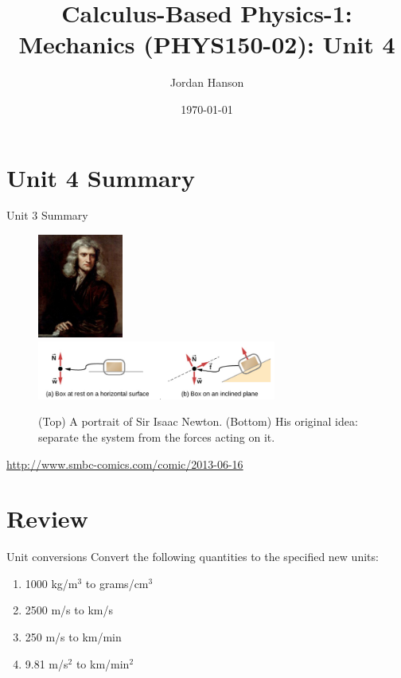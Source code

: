 \documentclass{beamer}
\title{Calculus-Based Physics-1: Mechanics (PHYS150-02): Unit 4}
\date{\today}
\author{Jordan Hanson}
\institute{Whittier College Department of Physics and Astronomy}
\begin{document}
\maketitle

\section{Unit 4 Summary}

\begin{frame}{Unit 3 Summary}
\begin{figure}
\centering
\includegraphics[width=0.25\textwidth]{figures/newton.png} \\
\includegraphics[width=0.7\textwidth]{figures/forcesA.png}
\caption{\label{fig:newton} (Top) A portrait of Sir Isaac Newton. (Bottom) His original idea: separate the system from the forces acting on it.}
\end{figure}
\url{http://www.smbc-comics.com/comic/2013-06-16}
\end{frame}

\section{Review}

\begin{frame}{Unit conversions}
Convert the following quantities to the specified new units:
\begin{enumerate}
\item 1000 kg/m$^3$ to grams/cm$^3$
\item 2500 m/s to km/s
\item 250 m/s to km/min
\item 9.81 m/s$^2$ to km/min$^2$
\end{enumerate}
\end{frame}
\end{document}
